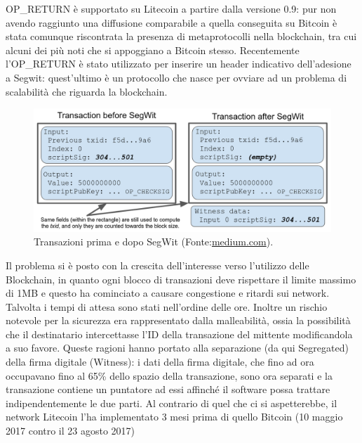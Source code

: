 OP\_RETURN è supportato su Litecoin a partire dalla versione 0.9: pur non avendo raggiunto una diffusione comparabile a quella conseguita su Bitcoin è stata comunque riscontrata la presenza di metaprotocolli nella blockchain, tra cui alcuni dei più noti che si appoggiano a Bitcoin stesso.
Recentemente l’OP\_RETURN è stato utilizzato per inserire un header indicativo dell’adesione a Segwit: quest’ultimo è un protocollo che nasce per ovviare ad un problema di scalabilità che riguarda la blockchain.

\begin{figure}[h!]
	\centering
	\includegraphics[width=1.0\linewidth]{images/before-after-segwit-medium}
	\caption{Transazioni prima e dopo SegWit (Fonte:\url{medium.com}).}
	\label{fig:before-after-segwit-medium}
\end{figure}


Il problema si è posto con la crescita dell’interesse verso l’utilizzo delle Blockchain, in quanto ogni blocco di transazioni deve rispettare il limite massimo di 1MB e questo ha cominciato a causare congestione e ritardi sui network. Talvolta i tempi di attesa sono stati nell’ordine delle ore. Inoltre un rischio notevole per la sicurezza era rappresentato dalla malleabilità, ossia la possibilità che il destinatario intercettasse l’ID della transazione del mittente modificandola a suo favore. Queste ragioni hanno portato alla separazione (da qui Segregated) della firma digitale (Witness): i dati della firma digitale, che fino ad ora occupavano fino al 65\% dello spazio della transazione, sono ora separati e la transazione contiene un puntatore ad essi affinché il software possa trattare indipendentemente le due parti. Al contrario di quel che ci si aspetterebbe, il network Litecoin l'ha implementato 3 mesi prima di quello Bitcoin (10 maggio 2017 contro il 23 agosto 2017)


